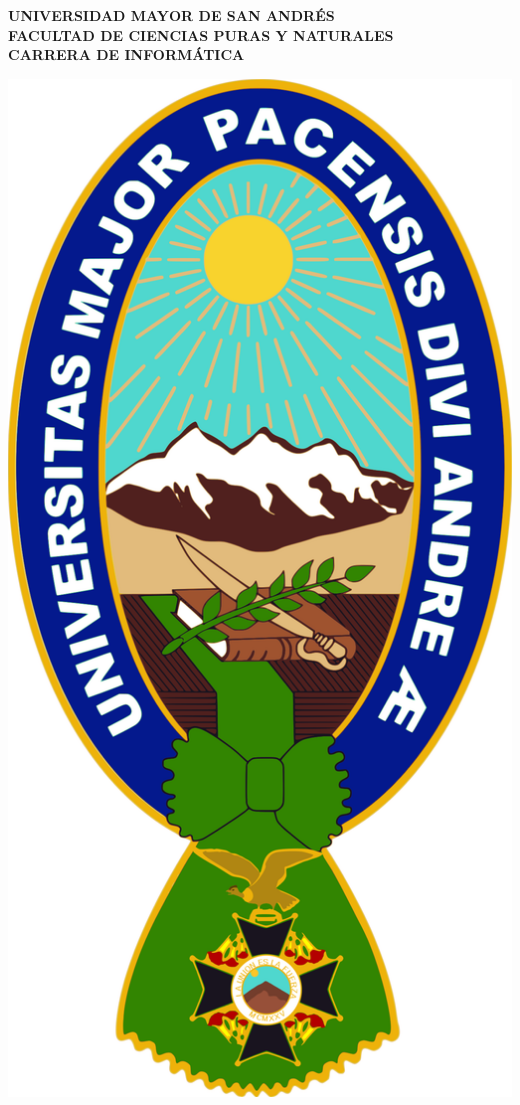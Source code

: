 \begin{titlepage} %
	\begin{center}
		\begin{spacing}{1.8}
			{\large \textbf{UNIVERSIDAD MAYOR DE SAN ANDRÉS}}\\
			{\large \textbf{FACULTAD DE CIENCIAS PURAS Y NATURALES}}\\
			{\large \textbf{CARRERA DE INFORMÁTICA}}
		\end{spacing}
		\vspace{8mm}
		
		\includegraphics[scale=0.11]{imagenes/logo-umsa.png}
		\vspace{6mm}
		

\end{center}
\end{titlepage}
